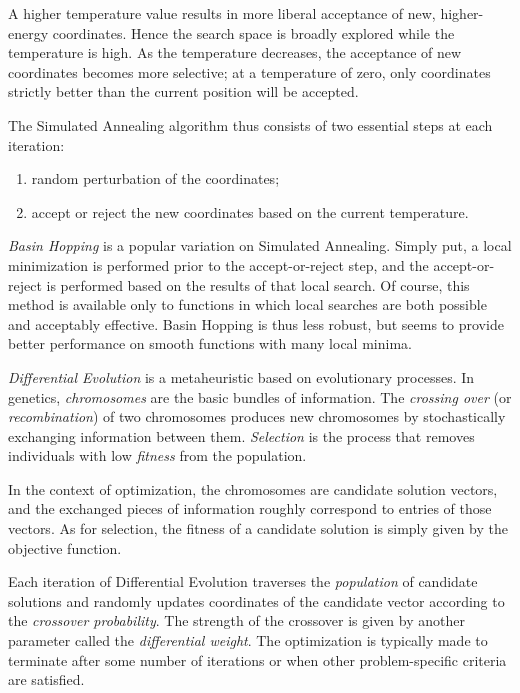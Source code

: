 \documentclass[12pt]{article}
\begin{document}
A higher temperature value results in more liberal acceptance of new,
higher-energy coordinates.
Hence the search space is broadly explored while the temperature is high.
As the temperature decreases, the acceptance of new coordinates becomes
more selective; at a temperature of zero, only coordinates strictly better
than the current position will be accepted.

The Simulated Annealing algorithm thus consists of two essential steps at each
iteration:
\begin{enumerate}
    \item random perturbation of the coordinates;
    \item accept or reject the new coordinates based on the current
        temperature.
\end{enumerate}

\emph{Basin Hopping}\cite{wales1997} is a popular variation on Simulated
Annealing.
Simply put, a local minimization is performed prior to the accept-or-reject
step, and the accept-or-reject is performed based on the results of that
local search.
Of course, this method is available only to functions in which local
searches are both possible and acceptably effective.
Basin Hopping is thus less robust, but seems to provide better performance
on smooth functions with many local minima.

\emph{Differential Evolution}\cite{storn1997} is a metaheuristic based on
evolutionary processes.
In genetics, \emph{chromosomes} are the basic bundles of information.
The \emph{crossing over} (or \emph{recombination}) of two chromosomes produces
new chromosomes by stochastically exchanging information between them.
\emph{Selection} is the process that removes individuals with low
\emph{fitness} from the population.

In the context of optimization, the chromosomes are candidate solution
vectors, and the exchanged pieces of information roughly correspond to
entries of those vectors. As for selection, the fitness of a candidate solution
is simply given by the objective function.

Each iteration of Differential Evolution traverses the \emph{population} of
candidate solutions and randomly updates coordinates of the candidate vector
according to the \emph{crossover probability}. The strength of the crossover is
given by another parameter called the \emph{differential weight}. The
optimization is typically made to terminate after some number of iterations or
when other problem-specific criteria are satisfied.
\end{document}
